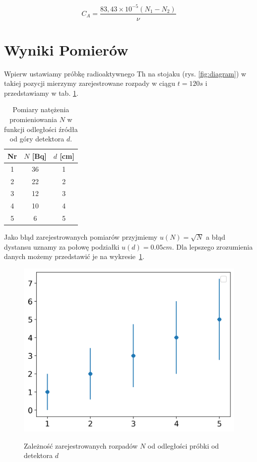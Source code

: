 \documentclass[12pt]{article}
\begin{document}
\begin{equation}
	C_A = \frac{83{,}43 \times 10^{-5} (N_1 - N_2)}{\nu}
	\label{eq:markov}
\end{equation}

\section{Wyniki Pomierów}
Wpierw ustawiamy próbkę radioaktywnego Th na stojaku (rys. \ref{fig:diagram}) w takiej pozycji mierzymy zarejestrowane rozpady w ciągu $t=120s$ i przedstawiamy w tab. \ref{tab:distance_measurments}.
\begin{table}[H]
	\centering
	\begin{tabular}{c|c|c}
		\toprule
		Nr & $N$ [Bq] & $d$ [cm] \\
		\midrule
		1  & 36       & 1        \\
		2  & 22       & 2        \\
		3  & 12       & 3        \\
		4  & 10       & 4        \\
		5  & 6        & 5        \\
		\bottomrule
	\end{tabular}
	\caption{Pomiary natężenia promieniowania $N$ w funkcji odległości źródła od góry detektora $d$.}
	\label{tab:distance_measurments}
\end{table}
Jako błąd zarejestrowanych pomiarów przyjmiemy $u(N) = \sqrt{N}$ a błąd dystansu uznamy za połowę podziałki $u(d) = 0.05 cm$.
Dla lepszego zrozumienia danych możemy przedstawić je na wykresie~\ref{fig:distance}.

\begin{figure}[H]
	\centering
	\includegraphics[scale=0.7]{distance}
	\label{fig:distance}
	\caption{Zależność zarejestrowanych rozpadów $N$ od odległości próbki od detektora $d$}
\end{figure}
\end{document}
